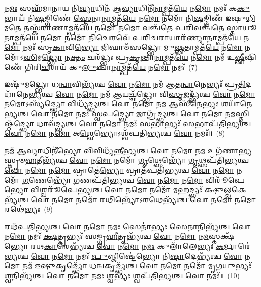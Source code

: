 {\anuvakamend[{𑌵𑌨𑌾᳴\-\ul{𑌨𑌾}\-𑌮𑍍𑌪𑌤᳴\-\ul{𑌯𑍇} 𑌨\-\ul{𑌮𑍋} 𑌨\-\ul{𑌮} 𑌏\-\ul{𑌕𑌾}\-𑌨𑍍𑌨\-\ul{𑌤𑍍𑌰𑌿}\-\-\ul{𑍞}\-𑌶𑌚𑍍𑌚᳴}]}%

𑌨\-\ul{𑌮𑌃} 𑌸𑌹᳴𑌮𑌾𑌨𑌾𑌯 𑌨𑌿\-\ul{𑌵𑍍𑌯𑌾}\-𑌧𑌿𑌨᳴ 𑌆\-\ul{𑌵𑍍𑌯𑌾}\-𑌧𑌿𑌨𑍀᳴\-\ul{𑌨𑌾}\-𑌮𑍍𑌪𑌤᳴\-\ul{𑌯𑍇} 𑌨\-\ul{𑌮𑍋} 𑌨𑌮𑌃᳴ 𑌕\-\ul{𑌕𑍁}\-𑌭𑌾𑌯᳴ 𑌨𑌿\-\ul{𑌷}\-𑌙𑍍𑌗𑌿𑌣𑍇॑ \ul{𑌸𑍍𑌤𑍇}\-𑌨𑌾\-\ul{𑌨𑌾}\-𑌮𑍍𑌪𑌤᳴\-\ul{𑌯𑍇} 𑌨\-\ul{𑌮𑍋} 𑌨𑌮𑍋᳴ 𑌨𑌿\-\ul{𑌷}\-𑌙𑍍𑌗𑌿𑌣᳴ 𑌇𑌷𑍁\-\ul{𑌧𑌿}\-𑌮\-\ul{𑌤𑍇} 𑌤𑌸𑍍𑌕᳴𑌰𑌾\-\ul{𑌣𑌾}\-𑌮𑍍𑌪𑌤᳴\-\ul{𑌯𑍇} 𑌨\-\ul{𑌮𑍋} 𑌨\-\ul{𑌮𑍋} 𑌵𑌞𑍍𑌚᳴𑌤𑍇 𑌪\-\ul{𑌰𑌿}\-𑌵𑌞𑍍𑌚᳴𑌤𑍇 𑌸𑍍𑌤𑌾\-\ul{𑌯𑍂}\-𑌨𑌾𑌮𑍍𑌪𑌤᳴\-\ul{𑌯𑍇} 𑌨\-\ul{𑌮𑍋} 𑌨𑌮𑍋᳴ 𑌨𑌿\-\ul{𑌚𑍇}\-𑌰𑌵𑍇᳴ 𑌪𑌰𑌿\-\ul{𑌚}\-𑌰𑌾𑌯𑌾𑌰᳴𑌣𑍍𑌯𑌾\-\ul{𑌨𑌾}\-𑌮𑍍𑌪𑌤᳴\-\ul{𑌯𑍇} 𑌨\-\ul{𑌮𑍋} 𑌨𑌮𑌃᳴ 𑌸𑍃\-\ul{𑌕𑌾}\-𑌵𑌿\-\ul{𑌭𑍍𑌯𑍋} 𑌜𑌿𑌘𑌾𑍞᳴𑌸𑌦𑍍𑌭𑍍𑌯𑍋 𑌮𑍁\-\ul{𑌷𑍍𑌣}\-𑌤𑌾𑌮𑍍𑌪𑌤᳴\-\ul{𑌯𑍇} 𑌨\-\ul{𑌮𑍋} 𑌨𑌮𑍋᳴\-𑌽\-\ul{𑌸𑌿}\-𑌮\-\ul{𑌦𑍍𑌭𑍍𑌯𑍋} 𑌨\-\ul{𑌕𑍍𑌤𑌂} 𑌚𑌰᳴𑌦𑍍𑌭𑍍𑌯𑌃 𑌪𑍍𑌰\-\ul{𑌕𑍃}\-𑌨𑍍𑌤𑌾\-\ul{𑌨𑌾}\-𑌮𑍍𑌪𑌤᳴\-\ul{𑌯𑍇} 𑌨\-\ul{𑌮𑍋} 𑌨𑌮᳴ 𑌉\-\ul{𑌷𑍍𑌣𑍀}\-𑌷𑌿𑌣𑍇᳴ 𑌗𑌿𑌰𑌿\-\ul{𑌚}\-𑌰𑌾𑌯᳴ 𑌕𑍁\-\ul{𑌲𑍁}\-𑌞𑍍𑌚𑌾\-\ul{𑌨𑌾}\-𑌮𑍍𑌪𑌤᳴\-\ul{𑌯𑍇} 𑌨\-\ul{𑌮𑍋} 𑌨𑌮𑌃᳴~(7)

𑌇𑌷𑍁᳴𑌮𑌦𑍍𑌭𑍍𑌯𑍋 𑌧\-\ul{𑌨𑍍𑌵𑌾}\-𑌵𑌿𑌭𑍍𑌯᳴𑌶𑍍𑌚 \ul{𑌵𑍋} 𑌨\-\ul{𑌮𑍋} 𑌨𑌮᳴ 𑌆𑌤\-\ul{𑌨𑍍𑌵𑌾}\-𑌨𑍇𑌭𑍍𑌯𑌃᳴ 𑌪𑍍𑌰\-\ul{𑌤𑌿}\-𑌦𑌧𑌾᳴𑌨𑍇𑌭𑍍𑌯𑌶𑍍𑌚 \ul{𑌵𑍋} 𑌨\-\ul{𑌮𑍋} 𑌨𑌮᳴ \ul{𑌆}\-𑌯𑌚𑍍𑌛᳴𑌦𑍍𑌭𑍍𑌯𑍋 𑌵𑌿\-\ul{𑌸𑍃}\-𑌜𑌦𑍍𑌭𑍍𑌯᳴𑌶𑍍𑌚 \ul{𑌵𑍋} 𑌨\-\ul{𑌮𑍋} 𑌨𑌮𑍋\-𑌽𑌸𑍍𑌯᳴\-\ul{𑌦𑍍𑌭𑍍𑌯𑍋} 𑌵𑌿𑌧𑍍𑌯᳴𑌦𑍍𑌭𑍍𑌯𑌶𑍍𑌚 \ul{𑌵𑍋} 𑌨\-\ul{𑌮𑍋} 𑌨\-\ul{𑌮} 𑌆𑌸𑍀᳴𑌨𑍇\-\ul{𑌭𑍍𑌯𑌃} 𑌶𑌯𑌾᳴𑌨𑍇𑌭𑍍𑌯𑌶𑍍𑌚 \ul{𑌵𑍋} 𑌨\-\ul{𑌮𑍋} 𑌨𑌮𑌃᳴ \ul{𑌸𑍍𑌵}\-𑌪\-\ul{𑌦𑍍𑌭𑍍𑌯𑍋} 𑌜𑌾𑌗𑍍𑌰᳴𑌦𑍍𑌭𑍍𑌯𑌶𑍍𑌚 \ul{𑌵𑍋} 𑌨\-\ul{𑌮𑍋} 𑌨\-\ul{𑌮}\-𑌸𑍍𑌤𑌿𑌷𑍍𑌠᳴\-\ul{𑌦𑍍𑌭𑍍𑌯𑍋} 𑌧𑌾𑌵᳴𑌦𑍍𑌭𑍍𑌯𑌶𑍍𑌚 \ul{𑌵𑍋} 𑌨\-\ul{𑌮𑍋} 𑌨𑌮𑌃᳴ \ul{𑌸}\-𑌭𑌾𑌭𑍍𑌯𑌃᳴ \ul{𑌸}\-𑌭𑌾𑌪᳴𑌤𑌿𑌭𑍍𑌯𑌶𑍍𑌚 \ul{𑌵𑍋} 𑌨\-\ul{𑌮𑍋} 𑌨\-\ul{𑌮𑍋} 𑌅\-\ul{𑌶𑍍𑌵𑍇}\-𑌭𑍍𑌯𑍋\-𑌽𑌶𑍍𑌵᳴𑌪𑌤𑌿𑌭𑍍𑌯𑌶𑍍𑌚 \ul{𑌵𑍋} 𑌨𑌮𑌃᳴॥~(8)

{\anuvakamend[{\-\ul{𑌕𑍁}\-\-\ul{𑌲𑍁}\-𑌞𑍍𑌚𑌾\-\ul{𑌨𑌾}\-𑌮𑍍𑌪𑌤᳴\-\ul{𑌯𑍇} 𑌨\-\ul{𑌮𑍋} 𑌨𑌮𑍋\-𑌽𑌶𑍍𑌵᳴𑌪𑌤𑌿\-\ul{𑌭𑍍𑌯}\-𑌸𑍍𑌤𑍍𑌰𑍀𑌣𑌿᳴ 𑌚}]}%

𑌨𑌮᳴ 𑌆\-\ul{𑌵𑍍𑌯𑌾}\-𑌧𑌿𑌨𑍀॑𑌭𑍍𑌯𑍋 \ul{𑌵𑌿}\-𑌵𑌿𑌧𑍍𑌯᳴𑌨𑍍𑌤𑍀𑌭𑍍𑌯𑌶𑍍𑌚 \ul{𑌵𑍋} 𑌨\-\ul{𑌮𑍋} 𑌨\-\ul{𑌮} 𑌉𑌗᳴𑌣𑌾𑌭𑍍𑌯𑌸𑍍𑌤𑍃𑍞\-\ul{𑌹}\-𑌤𑍀𑌭𑍍𑌯᳴𑌶𑍍𑌚 \ul{𑌵𑍋} 𑌨\-\ul{𑌮𑍋} 𑌨𑌮𑍋᳴ \ul{𑌗𑍃}\-𑌥𑍍𑌸𑍇𑌭𑍍𑌯𑍋᳴ \ul{𑌗𑍃}\-𑌥𑍍𑌸𑌪᳴𑌤𑌿𑌭𑍍𑌯𑌶𑍍𑌚 \ul{𑌵𑍋} 𑌨\-\ul{𑌮𑍋} 𑌨\-\ul{𑌮𑍋} 𑌵𑍍𑌰𑌾𑌤𑍇॑\-\ul{𑌭𑍍𑌯𑍋} 𑌵𑍍𑌰𑌾𑌤᳴𑌪𑌤𑌿𑌭𑍍𑌯𑌶𑍍𑌚 \ul{𑌵𑍋} 𑌨\-\ul{𑌮𑍋} 𑌨𑌮𑍋᳴ \ul{𑌗}\-𑌣𑍇𑌭𑍍𑌯𑍋᳴ \ul{𑌗}\-𑌣𑌪᳴𑌤𑌿𑌭𑍍𑌯𑌶𑍍𑌚 \ul{𑌵𑍋} 𑌨\-\ul{𑌮𑍋} 𑌨\-\ul{𑌮𑍋} 𑌵𑌿𑌰𑍂᳴𑌪𑍇𑌭𑍍𑌯𑍋 \ul{𑌵𑌿}\-𑌶𑍍𑌵𑌰𑍂᳴𑌪𑍇𑌭𑍍𑌯𑌶𑍍𑌚 \ul{𑌵𑍋} 𑌨\-\ul{𑌮𑍋} 𑌨𑌮𑍋᳴ \ul{𑌮}\-𑌹𑌦𑍍𑌭𑍍𑌯𑌃᳴ 𑌕𑍍𑌷𑍁\-\ul{𑌲𑍍𑌲}\-𑌕𑍇𑌭𑍍𑌯᳴𑌶𑍍𑌚 \ul{𑌵𑍋} 𑌨\-\ul{𑌮𑍋} 𑌨𑌮𑍋᳴ \ul{𑌰}\-𑌥𑌿𑌭𑍍𑌯𑍋᳴\-𑌽\-\ul{𑌰}\-𑌥𑍇𑌭𑍍𑌯᳴𑌶𑍍𑌚 \ul{𑌵𑍋} 𑌨\-\ul{𑌮𑍋} 𑌨\-\ul{𑌮𑍋} 𑌰𑌥𑍇॑𑌭𑍍𑌯𑌃~(9)

𑌰𑌥᳴𑌪𑌤𑌿𑌭𑍍𑌯𑌶𑍍𑌚 \ul{𑌵𑍋} 𑌨\-\ul{𑌮𑍋} 𑌨\-\ul{𑌮𑌃} 𑌸𑍇𑌨𑌾॑𑌭𑍍𑌯𑌃 𑌸𑍇\-\ul{𑌨𑌾}\-𑌨𑌿𑌭𑍍𑌯᳴𑌶𑍍𑌚 \ul{𑌵𑍋} 𑌨\-\ul{𑌮𑍋} 𑌨𑌮𑌃᳴ \ul{𑌕𑍍𑌷}\-𑌤𑍍𑌤𑍃𑌭𑍍𑌯𑌃᳴ 𑌸𑌙𑍍𑌗𑍍𑌰\-\ul{𑌹𑍀}\-𑌤𑍃𑌭𑍍𑌯᳴𑌶𑍍𑌚 \ul{𑌵𑍋} 𑌨\-\ul{𑌮𑍋} 𑌨\-\ul{𑌮}\-𑌸𑍍𑌤𑌕𑍍𑌷᳴𑌭𑍍𑌯𑍋 𑌰𑌥\-\ul{𑌕𑌾}\-𑌰𑍇𑌭𑍍𑌯᳴𑌶𑍍𑌚 \ul{𑌵𑍋} 𑌨\-\ul{𑌮𑍋} 𑌨\-\ul{𑌮𑌃} 𑌕𑍁𑌲𑌾᳴𑌲𑍇𑌭𑍍𑌯𑌃 \ul{𑌕}\-𑌰𑍍𑌮𑌾𑌰𑍇॑𑌭𑍍𑌯𑌶𑍍𑌚 \ul{𑌵𑍋} 𑌨\-\ul{𑌮𑍋} 𑌨𑌮𑌃᳴ \ul{𑌪𑍁}\-𑌞𑍍𑌜𑌿𑌷𑍍𑌟𑍇॑𑌭𑍍𑌯𑍋 𑌨𑌿\-\ul{𑌷𑌾}\-𑌦𑍇𑌭𑍍𑌯᳴𑌶𑍍𑌚 \ul{𑌵𑍋} 𑌨\-\ul{𑌮𑍋} 𑌨𑌮᳴ 𑌇\-\ul{𑌷𑍁}\-𑌕𑍃𑌦𑍍𑌭𑍍𑌯𑍋᳴ 𑌧\-\ul{𑌨𑍍𑌵}\-𑌕𑍃𑌦𑍍𑌭𑍍𑌯᳴𑌶𑍍𑌚 \ul{𑌵𑍋} 𑌨\-\ul{𑌮𑍋} 𑌨𑌮𑍋᳴ 𑌮𑍃\-\ul{𑌗}\-𑌯𑍁𑌭𑍍𑌯𑌃᳴ \ul{𑌶𑍍𑌵}\-𑌨𑌿𑌭𑍍𑌯᳴𑌶𑍍𑌚 \ul{𑌵𑍋} 𑌨\-\ul{𑌮𑍋} 𑌨\-\ul{𑌮𑌃} 𑌶𑍍𑌵\-\ul{𑌭𑍍𑌯𑌃} 𑌶𑍍𑌵𑌪᳴𑌤𑌿𑌭𑍍𑌯𑌶𑍍𑌚 \ul{𑌵𑍋} 𑌨𑌮𑌃᳴॥~(10)

